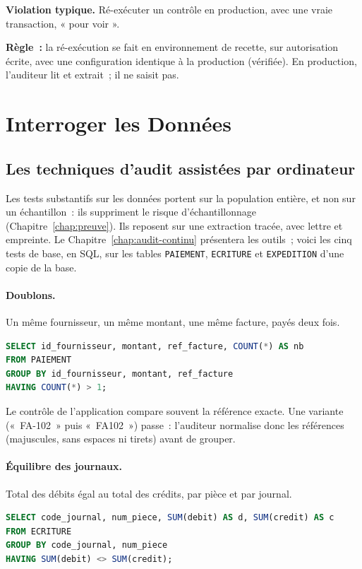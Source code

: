 \begin{boxalert}
\textbf{Violation typique.} Ré-exécuter un contrôle en production, avec une
vraie transaction, « pour voir ».

\smallskip
\textbf{Règle~:} la ré-exécution se fait en environnement de recette, sur
autorisation écrite, avec une configuration identique à la production
(vérifiée). En production, l'auditeur lit et extrait~; il ne saisit pas.
\end{boxalert}

\section{Interroger les Données}
\label{sec:c14-donnees}

\subsection{Les techniques d'audit assistées par ordinateur}

Les tests substantifs sur les données portent sur la population entière,
et non sur un échantillon~: ils suppriment le risque d'échantillonnage
(Chapitre~\ref{chap:preuve}). Ils reposent sur une extraction tracée, avec
lettre et empreinte. Le Chapitre~\ref{chap:audit-continu} présentera les
outils~; voici les cinq tests de base, en SQL, sur les tables
\texttt{PAIEMENT}, \texttt{ECRITURE} et \texttt{EXPEDITION} d'une copie de
la base.

\paragraph{Doublons.} Un même fournisseur, un même montant, une même
facture, payés deux fois.
\begin{lstlisting}[language=SQL]
SELECT id_fournisseur, montant, ref_facture, COUNT(*) AS nb
FROM PAIEMENT
GROUP BY id_fournisseur, montant, ref_facture
HAVING COUNT(*) > 1;
\end{lstlisting}

Le contrôle de l'application compare souvent la référence exacte. Une
variante («~FA-102~» puis «~FA102~») passe~: l'auditeur normalise donc les
références (majuscules, sans espaces ni tirets) avant de grouper.

\paragraph{Équilibre des journaux.} Total des débits égal au total des
crédits, par pièce et par journal.
\begin{lstlisting}[language=SQL]
SELECT code_journal, num_piece, SUM(debit) AS d, SUM(credit) AS c
FROM ECRITURE
GROUP BY code_journal, num_piece
HAVING SUM(debit) <> SUM(credit);
\end{lstlisting}

